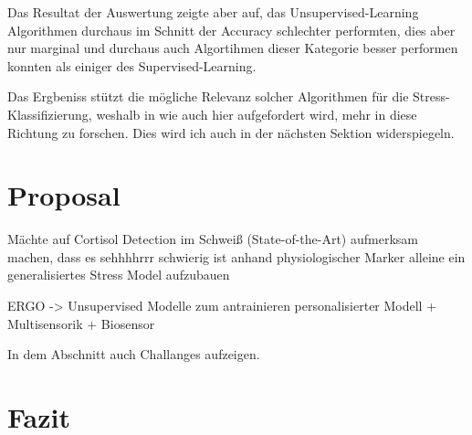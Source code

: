 Das Resultat der Auswertung zeigte aber auf, das Unsupervised-Learning Algorithmen durchaus im Schnitt der Accuracy schlechter performten, dies aber nur marginal und durchaus auch Algortihmen dieser Kategorie
besser performen konnten als einiger des Supervised-Learning.

Das Ergbeniss stützt die mögliche Relevanz solcher Algorithmen für die Stress-Klassifizierung, weshalb in \cite{Iqbal2022} wie auch hier aufgefordert wird, mehr in diese Richtung zu forschen. Dies wird ich auch in der nächsten Sektion widerspiegeln.


\section{Proposal}
    Mächte auf Cortisol Detection im Schweiß (State-of-the-Art) aufmerksam machen, dass es sehhhhrrr schwierig ist anhand physiologischer Marker alleine ein generalisiertes Stress Model aufzubauen

     ERGO -> Unsupervised Modelle zum antrainieren personalisierter Modell + Multisensorik + Biosensor

    In dem Abschnitt auch Challanges aufzeigen.

\section{Fazit}
    
    
